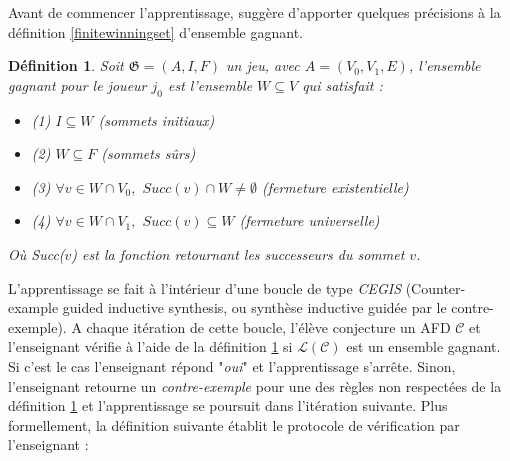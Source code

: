\documentclass[12pt,a4paper,oneside,titlepage]{report}
\newtheorem{defi}{D\'efinition}[section]
\begin{document}
Avant de commencer l'apprentissage, \cite{NeiderAutomaton} suggère d'apporter quelques précisions à la définition \ref{finitewinningset} d'ensemble gagnant.
\begin{defi}
\label{infinitewinningset}
Soit $\mathfrak{G}=(A,I,F)$ un jeu, avec $A=(V_0, V_1, E)$, l'\emph{ensemble gagnant} pour le joueur $j_0$ est l'ensemble $W\subseteq V$ qui satisfait :
\begin{itemize}
\item (1) $I\subseteq W$ (\emph{sommets initiaux})
\item (2) $W\subseteq F$ (\emph{sommets sûrs})
\item (3) $\forall v\in W\cap V_0,$ $Succ(v)\cap W\neq\emptyset$ (\emph{fermeture existentielle})
\item (4) $\forall v\in W\cap V_1,$ $Succ(v)\subseteq W$ (\emph{fermeture universelle})
\end{itemize}
Où \emph{Succ($v$)} est la fonction retournant les successeurs du sommet $v$.
\end{defi}
L'apprentissage se fait à l'intérieur d'une boucle de type \emph{CEGIS} (Counter-example guided inductive synthesis, ou synthèse inductive guidée par le contre-exemple). A chaque itération de cette boucle, l'élève conjecture un AFD $\mathcal{C}$ et l'enseignant vérifie à l'aide de la définition \ref{infinitewinningset} si $\mathcal{L}(\mathcal{C})$ est un ensemble gagnant. Si c'est le cas l'enseignant répond "\emph{oui}" et l'apprentissage s'arrête. Sinon, l'enseignant retourne un \emph{contre-exemple} pour une des règles non respectées de la définition \ref{infinitewinningset} et l'apprentissage se poursuit dans l'itération suivante. Plus formellement, la définition suivante établit le protocole de vérification par l'enseignant :
\end{document}
